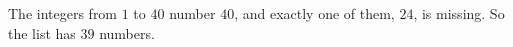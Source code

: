 The integers from $1$ to $40$ number $40$, and exactly one of them, $24$, is missing. So the list has $\boxed{39}$ numbers.
